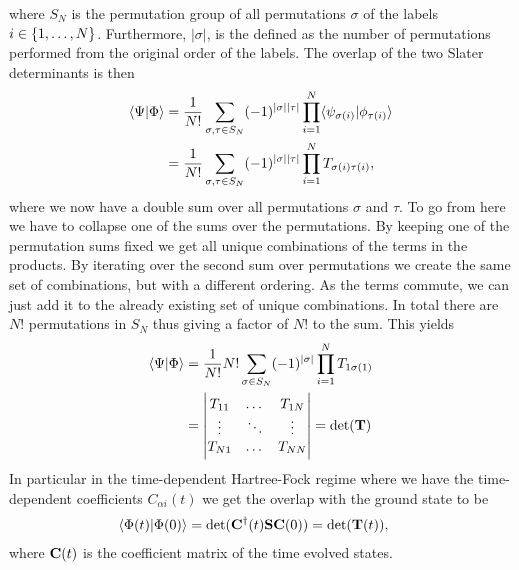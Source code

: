         where $S_N$ is the permutation group of all permutations $\sigma$ of the
        labels $i \in \left\{ 1, \dots, N \right\}$. Furthermore, $|\sigma|$, is the
        defined as the number of permutations performed from the original order
        of the labels. The overlap of the two Slater determinants is then
        \begin{align}
            \langle \Psi | \Phi \rangle
            &= \frac{1}{N!}
            \sum_{\sigma, \tau \in S_{N}}
            (-1)^{|\sigma||\tau|}
            \prod_{i = 1}^{N}
            \langle \psi_{\sigma(i)} | \phi_{\tau(i)} \rangle
            \\
            &= \frac{1}{N!}
            \sum_{\sigma, \tau \in S_{N}}
            (-1)^{|\sigma||\tau|}
            \prod_{i = 1}^{N}
            T_{\sigma(i)\tau(i)},
        \end{align}
        where we now have a double sum over all permutations $\sigma$ and
        $\tau$. To go from here we have to collapse one of the sums over the
        permutations. By keeping one of the permutation sums fixed we get all
        unique combinations of the terms in the products. By iterating over the
        second sum over permutations we create the same set of combinations, but
        with a different ordering. As the terms commute, we can just add it to
        the already existing set of unique combinations. In total there are $N!$
        permutations in $S_N$ thus giving a factor of $N!$ to the sum. This
        yields
        \begin{align}
            \langle \Psi | \Phi \rangle
            &= \frac{1}{N!}N!
            \sum_{\sigma \in S_N}
            (-1)^{|\sigma|}
            \prod_{i = 1}^{N}T_{1\sigma(1)}
            \\
            &= \begin{vmatrix}
                T_{11} & \dots & T_{1N} \\
                \vdots & \ddots & \vdots \\
                T_{N1} & \dots & T_{NN}
            \end{vmatrix}
            = \det(\mathbf{T})
        \end{align}
        In particular in the time-dependent Hartree-Fock regime where we have
        the time-dependent coefficients $C_{\alpha i}(t)$ we get the overlap
        with the ground state to be
        \begin{align}
            \langle \Phi(t) | \Phi(0) \rangle
            &= \det(\mathbf{C}^{\dagger}(t)\mathbf{S}\mathbf{C}(0))
            = \det(\mathbf{T}(t)),
        \end{align}
        where $\mathbf{C}(t)$ is the coefficient matrix of the time evolved states.

